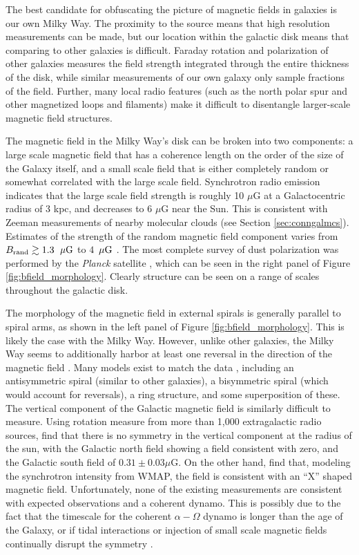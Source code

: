 The best candidate for obfuscating the picture of magnetic fields in galaxies is
our own Milky Way.  The proximity to the source means that high resolution
measurements can be made, but our location within the galactic disk means that comparing
to other galaxies is difficult.  Faraday rotation and polarization of other
galaxies measures the field strength integrated through the entire thickness of
the disk, while similar measurements of our own galaxy only sample fractions of
the field.  Further, many local radio features (such as the north
polar spur and other magnetized loops and filaments) make it difficult
to disentangle larger-scale magnetic field structures.

The magnetic field in the Milky Way's disk can be broken into two
components: a large scale magnetic field that has a coherence length
on the order of the size of the Galaxy itself, and a small scale field
that is either completely random or somewhat correlated with the large
scale field.  Synchrotron radio emission indicates that the large
scale field strength is roughly 10 $\mu$G at a Galactocentric radius
of 3 kpc, and decreases to 6 $\mu$G near the Sun.  This is consistent
with Zeeman measurements of nearby molecular clouds (see Section
\ref{sec:conngalmcs}).  Estimates of the strength of the random
magnetic field component varies from $B_{\rm{rand}} \gtrsim
1.3$~$\mu\rm{G}$ \citep{Gaensler01} to $4$~$\mu\rm{G}$
\citep{Fauvet11}.
The most complete survey of dust polarization was performed by the
\emph{Planck} satellite \citep{PlanckIntermediateXIX15}, which can be seen in
the right panel of Figure \ref{fig:bfield_morphology}.  Clearly structure can
be seen on a range of scales throughout the galactic disk.

The morphology of the magnetic field in external spirals is generally parallel
to spiral arms, as shown in the left panel of Figure \ref{fig:bfield_morphology}.  This is
likely the case with the Milky Way.  However, unlike other galaxies, the Milky Way
seems to additionally harbor at least one reversal in the direction of the
magnetic field
\citep{Thomson80, Jaffe11}.  Many models exist to match the data \citep[see the
recent review by][]{2015ASSL..407..483H}, including an antisymmetric spiral (similar to
other galaxies), a bisymmetric spiral (which would account for reversals), a
ring structure, and some superposition of these.  The vertical component of the
Galactic magnetic field is similarly difficult to measure.  Using rotation
measure from more than 1,000 extragalactic radio sources, \cite{Mao10} find
that there is no symmetry in the vertical component at the radius of the sun,
with the Galactic north field showing a field consistent with zero, and the
Galactic south field of $0.31 \pm 0.03 \mu$G.  On the other hand,
\cite{Jansson12} find that, modeling the synchrotron intensity from WMAP, the
field is consistent with an ``X'' shaped magnetic field.
Unfortunately, none of the existing measurements are 
consistent with expected observations and a coherent dynamo. This is
possibly due to the fact that the timescale for the coherent $\alpha-\Omega$
dynamo is longer than the age of the Galaxy, or if tidal interactions or
injection of small scale magnetic fields continually disrupt the symmetry
\citep{Moss12}.  

